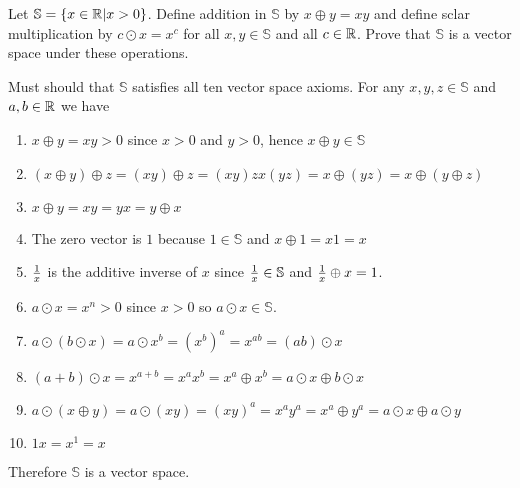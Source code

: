 \documentclass[english, 12pt]{article}
\begin{document}
\begin{exmp}
Let $\mathbb{S}  = \{x \in {\mathbb{R}} | x > 0\}$. Define addition in $\mathbb{S}$ by $x \oplus y = xy$ and define sclar multiplication by $c \odot x = x^c$ for all $x,y \in \mathbb{S}$ and all $c \in {\mathbb{R}}$. Prove that $\mathbb{S}$ is a vector space under these operations.


\begin{sol}
Must should that $\mathbb{S}$ satisfies all ten vector space axioms. For any $x,y,z \in \mathbb{S}$ and $a,b \in {\mathbb{R}}$ we have
\begin{enumerate}
\item $x \oplus y = xy > 0 $ since $ x > 0$ and $y > 0$, hence $x \oplus y \in \mathbb{S}$
\item $(x \oplus y) \oplus z = (xy) \oplus z = (xy)z  x(yz) = x \oplus (yz) = x \oplus (y \oplus z)$
\item $x \oplus y = xy = yx = y \oplus x$
\item The zero vector is $1$ because $1 \in \mathbb{S}$ and $x \oplus 1 = x1 = x$
\item $\frac{1}{x}$ is the additive inverse of $x$ since $\frac{1}{x} \in \mathbb{S}$ and $\frac{1}{x} \oplus x = 1$.
\item $a \odot x = x^n > 0$ since $x > 0$ so $a \odot x \in \mathbb{S}$.
\item $a \odot (b \odot x) = a \odot x^b = (x^b)^a = x^{ab} = (ab) \odot x$
\item $(a+b) \odot x = x^{a+b} = x^a x^b = x^a \oplus x^b = a \odot x \oplus b \odot x$
\item $a \odot (x \oplus y) = a \odot (xy) = (xy)^a = x^a y^a = x^a \oplus y^a = a \odot x \oplus a \odot y$
\item $1x = x^1 = x$
\end{enumerate}
Therefore $\mathbb{S}$ is a vector space.
\end{sol}
\end{exmp}
\end{document}
